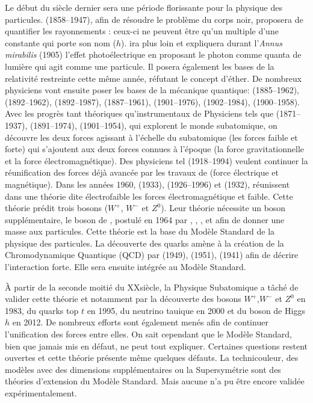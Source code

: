 Le début du siècle dernier sera une période florissante pour la physique des particules.  (\num{1858}--\num{1947}), afin de résoudre le problème du corps noir, proposera de quantifier les rayonnements : ceux-ci ne peuvent être qu'un multiple d'une constante qui porte son nom ($h$).  ira plus loin et expliquera durant l'\textit{Annus mirabilis} (\num{1905}) l'effet photoélectrique en proposant le photon comme quanta de lumière qui agit comme une particule. Il posera également les bases de la relativité restreinte cette même année, réfutant le concept d'éther. De nombreux physiciens vont ensuite poser les bases de la mécanique quantique:  (\num{1885}--\num{1962}),  (\num{1892}--\num{1962}),  (\num{1892}--\num{1987}),  (\num{1887}--\num{1961}),  (\num{1901}--\num{1976}),  (\num{1902}--\num{1984}),  (\num{1900}--\num{1958}). Avec les progrès tant théoriques qu'instrumentaux de Physiciens tels que  (\num{1871}--\num{1937}),  (\num{1891}--\num{1974}),  (\num{1901}--\num{1954}), qui explorent le monde subatomique, on découvre les deux forces agissant à l'échelle du subatomique (les forces faible et forte) qui s'ajoutent aux deux forces connues à l'époque (la force gravitationnelle et la force électromagnétique). Des physiciens tel  (\num{1918}--\num{1994}) veulent continuer la réunification des forces déjà avancée par les travaux de  (force électrique et magnétique). Dans les années \num{1960},  (\num{1933}),  (\num{1926}--\num{1996}) et  (\num{1932}), réunissent dans une théorie dite électrofaible les forces électromagnétique et faible. Cette théorie prédit trois bosons ($W^{+}$, $W^{-}$ et $Z^{0}$). Leur théorie nécessite un boson supplémentaire, le boson de , postulé en \num{1964} par , , ,  et  afin de donner une masse aux particules. Cette théorie est la base du Modèle Standard de la physique des particules. La découverte des quarks amène à la création de la Chromodynamique Quantique (QCD) par  (\num{1949}),  (\num{1951}),  (\num{1941}) afin de décrire l'interaction forte. Elle sera ensuite intégrée au Modèle Standard.

À partir de la seconde moitié du XX\ieme siècle, la Physique Subatomique a tâché de valider cette théorie et notamment par la découverte des bosons  $W^{+}$,$W^{-}$ et $Z^{0}$ en \num{1983}, du quarks top $t$ en \num{1995}, du neutrino tauique en \num{2000} et du boson de Higgs $h$ en \num{2012}. De nombreux efforts sont également menés afin de continuer l'unification des forces entre elles. On sait cependant que le Modèle Standard, bien que jamais mis en défaut, ne peut tout expliquer. Certaines questions restent ouvertes et cette théorie présente même quelques défauts. La technicouleur, des modèles avec des dimensions supplémentaires ou la Supersymétrie sont des théories d'extension du Modèle Standard. Mais aucune n'a pu être encore validée expérimentalement.

